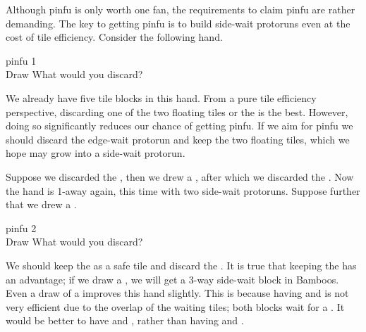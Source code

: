 Although {\jap pinfu} is only worth one {\jap fan}, the requirements to claim {\jap pinfu} are rather demanding. The key to getting {\jap pinfu} is to build side-wait protoruns even at the cost of tile efficiency. Consider the following hand. 
\begin{itembox}[r]{{\jap pinfu} 1}
\bp
{}~\\
\hspace{290pt}\footnotesize{Draw}
\ep
\vspace{-17pt}What would you discard? \vspace{-5pt}
\end{itembox}
\noindent
We already have five tile blocks in this hand. From a pure tile efficiency perspective, discarding one of the two floating tiles {\large{}} or the {\large{}} is the best. However, doing so significantly reduces our chance of getting {\jap pinfu}. If we aim for {\jap pinfu} we should discard the edge-wait protorun {\large{}} and keep the two floating tiles, which we hope may grow into a side-wait protorun. 

\bigskip
Suppose we discarded the {\large{}}, then we drew a {\large{}}, after which we discarded the {\large{}}. Now the hand is 1-away again, this time with two side-wait protoruns. Suppose further that we drew a {\large\xi}. 
\begin{itembox}[r]{{\jap pinfu} 2}
\bp
{}~\xi\\
\hspace{290pt}\footnotesize{Draw}
\ep
\vspace{-17pt}What would you discard? \vspace{-5pt}
\end{itembox}
\noindent
We should keep the {\large\xi} as a safe tile and discard the {\large{}}. It is true that keeping the {\large{}} has an advantage; if we draw a {\large{}}, we will get a 3-way side-wait block in Bamboos. Even a draw of a {\large{}} improves this hand slightly. This is because having {\large{}} and {\large{}} is not very efficient due to the overlap of the waiting tiles; both blocks wait for a {\large{}}. It would be better to have {\large{}} and {\large{}}, rather than having {\large{}} and {\large{}}.

